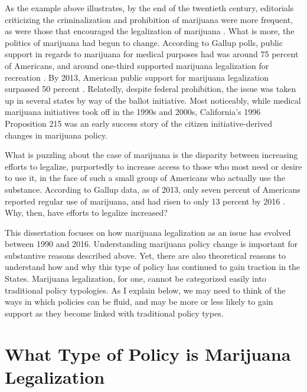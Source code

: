 As the example above illustrates, by the end of the twentieth century, editorials criticizing the criminalization and prohibition of marijuana were more frequent, as were those that encouraged the legalization of marijuana  \citep{mosher_and_akin_2019}. %
What is more, the politics of marijuana had begun to change. According to Gallup polls, public support in regards to marijuana for medical purposes had was around 75 percent of Americans, and around one-third supported marijuana legalization for recreation \citep{gallup_2001,gallup_2003}. By 2013, American public support for marijuana legalization surpassed 50 percent \citep{gallup_2013}. Relatedly, despite federal prohibition, the issue was taken up in several states by way of the ballot initiative. Most noticeably, while medical marijuana initiatives took off in the 1990s and 2000s, California's 1996 Proposition 215 was an early success story of the citizen initiative-derived changes in marijuana policy.

What is puzzling about the case of marijuana is the disparity between increasing efforts to legalize, purportedly to increase access to those who most need or desire to use it, in the face of such a small group of Americans who actually use the substance. According to Gallup data, as of 2013, only seven percent of Americans reported regular use of marijuana, and had risen to only 13 percent by 2016 \citep{gallup_2016}. Why, then, have efforts to legalize increased?

This dissertation focuses on how marijuana legalization as an issue has evolved between 1990 and 2016. Understanding marijuana policy change is important for substantive reasons described above. Yet, there are also theoretical reasons to understand how and why this type of policy has continued to gain traction in the States. Marijuana legalization, for one, cannot be categorized easily into traditional policy typologies. As I explain below, we may need to think of the ways in which policies can be fluid, and may be more or less likely to gain support as they become linked with traditional policy types. 


\section{What Type of Policy is Marijuana Legalization}

